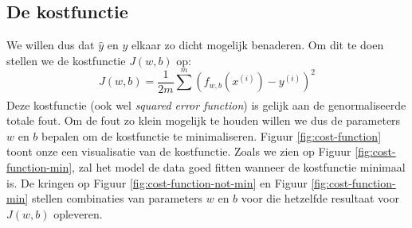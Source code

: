 \subsection{De kostfunctie}
We willen dus dat $\hat{y}$ en $y$ elkaar zo dicht mogelijk benaderen. Om dit te doen stellen we de kostfunctie $J(w,b)$ op:
\begin{equation}
	J(w, b) = \frac{1}{2m}\sum_{}^{m}(f_{w,b}(x^{(i)}) - y^{(i)})^{2}
	\label{eq:cost-function}
\end{equation}
\noindent
Deze kostfunctie (ook wel \textit{squared error function}) is gelijk aan de genormaliseerde totale fout. Om de fout zo klein mogelijk te houden willen we dus de parameters $w$ en $b$ bepalen om de kostfunctie te minimaliseren. Figuur \ref{fig:cost-function} toont onze een visualisatie van de kostfunctie. Zoals we zien op Figuur \ref{fig:cost-function-min}, zal het model de data goed fitten wanneer de kostfunctie minimaal is. De kringen op Figuur \ref{fig:cost-function-not-min} en Figuur \ref{fig:cost-function-min} stellen combinaties van parameters $w$ en $b$ voor die hetzelfde resultaat voor $J(w, b)$ opleveren.

